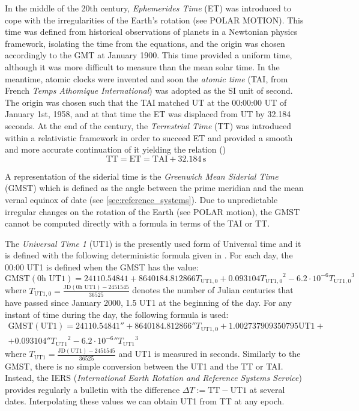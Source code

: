 \documentclass[../main.tex]{subfiles}
\begin{document}
In the middle of the 20th century, \emph{Ephemerides Time} (ET) was introduced to cope with the irregularities of the Earth's rotation (see POLAR MOTION). This time was defined from historical observations of planets in a Newtonian physics framework, isolating the time from the equations, and the origin was chosen accordingly to the GMT at January 1900. This time provided a uniform time, although it was more difficult to measure than the mean solar time. In the meantime, atomic clocks were invented and soon the \emph{atomic time} (TAI, from French \emph{Temps Athomique International}) was adopted as the SI unit of second. The origin was chosen such that the TAI matched UT at the 00:00:00 UT of January 1st, 1958, and at that time the ET was displaced from UT by 32.184 seconds. At the end of the century, the \emph{Terrestrial Time} (TT) was introduced within a relativistic framework in order to succeed ET and provided a smooth and more accurate continuation of it yielding the relation (\cite{montenbruck})
\begin{equation}
  \text{TT}=\text{ET}= \text{TAI} + 32.184\,\mathrm{s}
\end{equation}

A representation of the siderial time is the \emph{Greenwich Mean Siderial Time} (GMST) which is defined as the angle between the prime meridian and the mean vernal equinox of date (see \cref{sec:reference_systems}). Due to unpredictable irregular changes on the rotation of the Earth (see POLAR motion), the GMST cannot be computed directly with a formula in terms of the TAI or TT.

The \emph{Universal Time 1} (UT1) is the presently used form of Universal time and it is defined with the following deterministic formula given in \cite{aoki}. For each day, the 00:00 UT1 is defined when the GMST has the value:
\begin{equation}
  \mathrm{GMST}(0\text{h UT1})=24110.54841+8640184.812866{T_{\text{UT1},0}}+0.093104{T_{\text{UT1},0}}^2-6.2\cdot 10^{-6}{T_{\text{UT1},0}}^3
\end{equation}
where $T_{\text{UT1},0}=\frac{\text{JD}(0\text{h UT1})-2451545}{36525}$ denotes the number of Julian centuries that have passed since January 2000, 1.5 UT1 at the beginning of the day. For any instant of time during the day, the following formula is used:
\begin{multline}
  \mathrm{GMST}(\mathrm{UT1})=24110.54841''+8640184.812866''{T_{\text{UT1},0}}+1.002737909350795\text{UT1}+\\+0.093104''{T_{\text{UT1}}}^2-{6.2\cdot 10^{-6}}''{T_{\text{UT1}}}^3
\end{multline}
where $T_\text{UT1}=\frac{\text{JD}(\text{UT1})-2451545}{36525}$ and UT1 is measured in seconds. Similarly to the GMST, there is no simple conversion between the UT1 and the TT or TAI. Instead, the IERS (\emph{International Earth Rotation and Reference Systems Service}) provides regularly a bulletin with the difference $\Delta T:= \mathrm{TT}-\mathrm{UT1}$ at several dates. Interpolating these values we can obtain UT1 from TT at any epoch.
\end{document}
